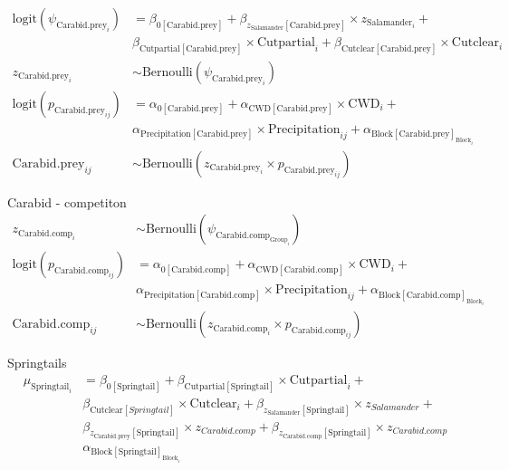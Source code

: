 \begin{align}
  \text{logit}(\psi_{\text{Carabid.prey}_i}) &= 
  \beta_{0[\text{Carabid.prey}]} + \beta_{z_{\text{Salamander}}[\text{Carabid.prey}]} \times z_{\text{Salamander}_i} + \nonumber \\
  &\beta_{\text{Cutpartial}[\text{Carabid.prey}]} \times \text{Cutpartial}_i + \beta_{\text{Cutclear}[\text{Carabid.prey}]} \times \text{Cutclear}_i \nonumber\\
  z_{\text{Carabid.prey}_i} &\sim 
  \text{Bernoulli}(\psi_{\text{Carabid.prey}_i}) \nonumber \\
  \text{logit}(p_{\text{Carabid.prey}_{ij}}) &= 
  \alpha_{0[\text{Carabid.prey}]} + \alpha_{\text{CWD}[\text{Carabid.prey}]} \times \text{CWD}_i +  \\
  &\alpha_{\text{Precipitation}[\text{Carabid.prey}]} \times \text{Precipitation}_{ij} + \alpha_{\text{Block}[\text{Carabid.prey}]_{\text{Block}_i}} \nonumber \\
  \text{Carabid.prey}_{ij} &\sim 
  \text{Bernoulli}(z_{\text{Carabid.prey}_i} \times p_{\text{Carabid.prey}_{ij}}) \nonumber
\end{align}

Carabid - competiton \\

\begin{align}
z_{\text{Carabid.comp}_i} &\sim 
\text{Bernoulli}(\psi_{\text{Carabid.comp}_{\text{Group}_i}}) \nonumber \\
\text{logit}(p_{\text{Carabid.comp}_{ij}}) &= 
\alpha_{0[\text{Carabid.comp}]} + \alpha_{\text{CWD}[\text{Carabid.comp}]} \times \text{CWD}_i + \\
&\alpha_{\text{Precipitation}[\text{Carabid.comp}]} \times \text{Precipitation}_{ij} + \alpha_{\text{Block}[\text{Carabid.comp}]_{\text{Block}_i}} \nonumber \\
\text{Carabid.comp}_{ij} &\sim 
\text{Bernoulli}(z_{\text{Carabid.comp}_i} \times p_{\text{Carabid.comp}_{ij}}) \nonumber
\end{align}

Springtails \\

\begin{align}
  \mu_{\text{Springtail}_i} &=
  \beta_{0[\text{Springtail}]} + \beta_{\text{Cutpartial}[\text{Springtail}]} \times \text{Cutpartial}_i + \nonumber\\
  &\beta_{\text{Cutclear}[Springtail]} \times \text{Cutclear}_i + \beta_{z_{\text{Salamander}}[\text{Springtail}]} \times z_{Salamander} + \\
  &\beta_{z_{\text{Carabid.prey}}[\text{Springtail}]} \times z_{Carabid.comp} + \beta_{z_{\text{Carabid.comp}}[\text{Springtail}]} \times z_{Carabid.comp} \nonumber\\
  &\alpha_{\text{Block}[\text{Springtail}]_{\text{Block}_i}} \nonumber
\end{align}





